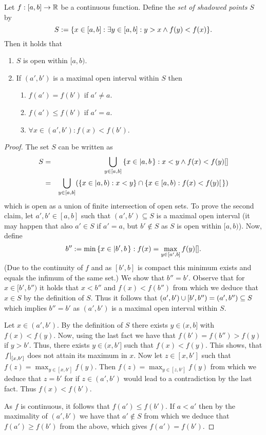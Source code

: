 \documentclass[8pt,a4paper]{article}
\begin{document}
\begin{lemma}
Let $f:[a,b]\rightarrow\mathbb{R}$ be a continuous function. Define the \emph{set
of shadowed points} $S$ by
\begin{equation}
S:=\{x\in [a,b]:\exists y\in[a,b]:y>x\wedge f(y)<f(x)\}\textrm{.}
\end{equation}
Then it holds that
\begin{enumerate}
\item $S$ is open within $[a,b)$. 
\item If $(a',b')$ is a maximal open interval within $S$ then 
\begin{enumerate}
\item$f(a')=f(b')$ if $a'\neq a$.
\item $f(a')\leq f(b')$ if $a'=a$.
\item $\forall x\in(a',b'):f(x)<f(b')$. 
\end{enumerate}
\end{enumerate}
\end{lemma}

\begin{proof}
The set $S$ can be written as
\begin{eqnarray*}
    S
    &=& \Setjoin_{y\in[a,b]}\set{x\in[a,b]:x<y \lgand f(x)<f(y)}\\
    &=& \Setjoin_{y\in[a,b]}(\set{x\in[a,b):x<y\}\setmeet\{x\in[a,b):f(x)<f(y)})
\end{eqnarray*}
which is open as a union of finite intersection of open sets.
To prove the second claim, let $a',b'\in [a,b]$ such that
$(a',b')\subseteq S$ is a maximal open interval (it may happen that also
$a'\in S$ if $a'=a$, but $b'\not\in S$ as $S$ is open within $[a,b)$). Now, define
\begin{equation}
b'':=\min\set{x\in[b',b]:f(x)=\max_{y\in[a',b]}{f(y)}}\textrm{.}
\end{equation}
(Due to the continuity of $f$ and as $[b',b]$ is compact this minimum exists and equals the
infimum of the same set.) We show that $b''=b'$. Observe that for
$x\in[b',b'')$ it holds that $x<b''$ and $f(x)<f(b'')$ from which we
deduce that $x\in S$ by the definition of $S$.
Thus it follows that $(a',b')\cup[b',b'')=(a',b'')\subseteq S$
which implies $b''=b'$ as $(a',b')$ is a maximal open interval within
$S$.

Let $x\in(a',b')$. By the definition of $S$ there exists $y\in(x,b]$
with $f(x)<f(y)$. Now, using the last fact we have that
$f(b')=f(b'')>f(y)$ if $y>b'$. Thus, there exists $y\in(x,b']$ such
that $f(x)<f(y)$. This shows, that $\left. f\right\vert_{[x,b']}$ does not attain its
maximum in $x$. Now let $z\in[x,b']$ such that
$f(z)=\max_{y\in[x,b']}{f(y)}$. Then $f(z)=\max_{y\in[z,b']}{f(y)}$
from which we deduce that $z=b'$ for if $z\in(a',b')$ would lead to a
contradiction by the last fact. Thus $f(x)<f(b')$.

As $f$ is continuous, it follows that $f(a')\leq f(b')$. If $a<a'$
then by the maximality of $(a',b')$ we have that $a'\notin S$ from
which we deduce that $f(a')\geq f(b')$ from the above, which gives $f(a')=f(b')$. 
\end{proof}
\end{document}
